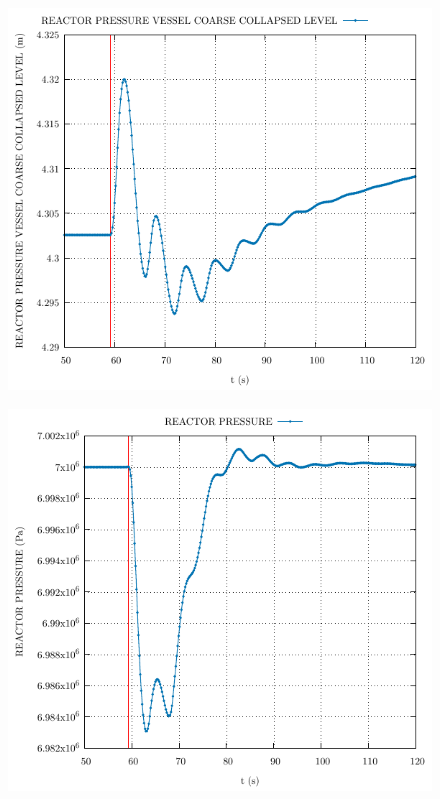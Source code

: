 \documentclass{article}
\begin{document}
\begin{multicols}{2}
\begin{figure}[H]
\end{figure}
\begin{figure}[H]
\centering
\includegraphics[width=\linewidth]{./graphs/REACTOR PRESSURE VESSEL COARSE COLLAPSED LEVEL_comp.pdf}
\end{figure}
\begin{figure}[H]
\centering
\includegraphics[width=\linewidth]{./graphs/REACTOR PRESSURE_comp.pdf}

\end{figure}
\end{multicols}
\end{document}
